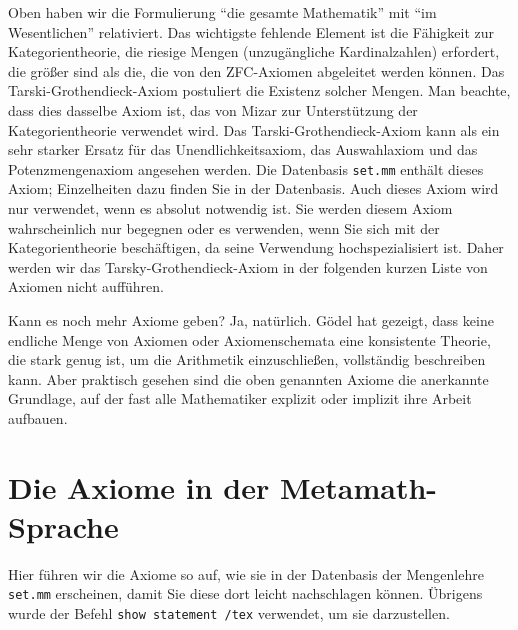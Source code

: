 Oben haben wir die Formulierung "`die gesamte Mathematik"' mit "`im Wesentlichen"' relativiert. Das wichtigste fehlende Element ist die Fähigkeit zur Kategorientheorie, die riesige Mengen (unzugängliche Kardinalzahlen) erfordert, die größer sind als die, die von den ZFC-Axiomen abgeleitet werden können. Das Tarski-Grothendieck-Axiom postuliert die Existenz solcher Mengen. Man beachte, dass dies dasselbe Axiom ist, das von Mizar zur Unterstützung der Kategorientheorie verwendet wird. Das Tarski-Grothendieck-Axiom kann als ein sehr starker Ersatz für das Unendlichkeitsaxiom, das Auswahlaxiom und das Potenzmengenaxiom angesehen werden. Die Datenbasis \texttt{set.mm} enthält dieses Axiom; Einzelheiten dazu finden Sie in der Datenbasis. Auch dieses Axiom wird nur verwendet, wenn es absolut notwendig ist. Sie werden diesem Axiom wahrscheinlich nur begegnen oder es verwenden, wenn Sie sich mit der Kategorientheorie beschäftigen, da seine Verwendung hochspezialisiert ist. Daher werden wir das Tarsky-Grothendieck-Axiom in der folgenden kurzen Liste von Axiomen nicht auf\-führen.

Kann es noch mehr Axiome geben? Ja, natürlich. G\"{o}del hat gezeigt, dass keine endliche Menge von Axiomen oder Axiomenschemata eine konsistente Theorie, die stark genug ist, um die Arithmetik einzuschließen, vollständig beschreiben kann. Aber praktisch gesehen sind die oben genannten Axiome die anerkannte Grundlage, auf der fast alle Mathematiker explizit oder implizit ihre Arbeit aufbauen.

\section{Die Axiome in der Metamath-Sprache}\label{metaaxioms}

Hier führen wir die Axiome so auf, wie sie in der Datenbasis der Mengenlehre \texttt{set.mm} erscheinen, damit Sie diese dort leicht nachschlagen können.  Übrigens wurde der Befehl \texttt{show statement /tex} verwendet, um sie darzustellen.

\newbox\mlinebox
\newbox\mtrialbox
\newbox\startprefix  %
\newbox\contprefix  %
\def\startm{  %
  \setbox\mlinebox=\hbox{\unhcopy\startprefix}
}
\def\m#1{  %
  \setbox\mtrialbox=\hbox{\unhcopy\mlinebox $\,#1$}
  \ifdim\wd\mtrialbox>\hsize
    \box\mlinebox
    \setbox\mlinebox=\hbox{\unhcopy\contprefix $\,#1$}
  \else
    \setbox\mlinebox=\hbox{\unhbox\mtrialbox}
  \fi
}
\def\endm{  %
  \box\mlinebox
}

